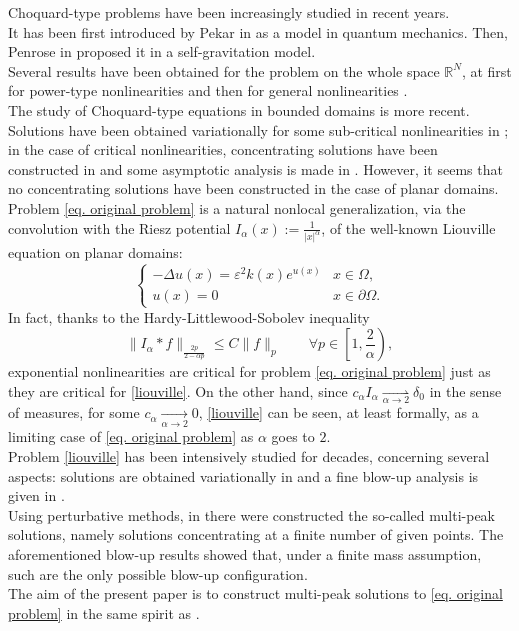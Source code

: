 \documentclass[11pt]{article}
\begin{document}
Choquard-type problems have been increasingly studied in recent years.\\
It has been first introduced by Pekar in \cite{pek} as a model in quantum mechanics. Then, Penrose in \cite{pen} proposed it in a self-gravitation model.\\
Several results have been obtained for the problem on the whole space $\mathbb R^N$, at first for power-type nonlinearities \cite{lieb,lio} and then for general nonlinearities \cite{mvs,bvs}.\\
The study of Choquard-type equations in bounded domains is more recent. Solutions have been obtained variationally for some sub-critical nonlinearities in \cite{gp,bc}; in the case of critical nonlinearities, concentrating solutions have been constructed in \cite{ghp} and some asymptotic analysis is made in \cite{ccyz}. However, it seems that no concentrating solutions have been constructed in the case of planar domains.\\

Problem \eqref{eq. original problem} is a natural nonlocal generalization, via the convolution with the Riesz potential $I_\alpha(x):=\frac1{|x|^\alpha}$, of the well-known Liouville equation on planar domains:
\begin{equation}\label{liouville}
\left\{\begin{array}{ll}-\Delta u(x)=\varepsilon^2k(x)e^{u(x)}&x\in\Omega,\\u(x)=0&x\in\partial\Omega.\end{array}\right.
\end{equation}
In fact, thanks to the Hardy-Littlewood-Sobolev inequality
$$\|I_\alpha\ast f\|_{\frac{2p}{2-\alpha p}}\le C\|f\|_p\qquad\forall p\in\left[1,\frac2\alpha\right),$$
exponential nonlinearities are critical for problem \eqref{eq. original problem} just as they are critical for \eqref{liouville}. On the other hand, since $c_\alpha I_\alpha\underset{\alpha\to2}\rightharpoonup\delta_0$ in the sense of measures, for some $c_\alpha\underset{\alpha\to2}\to0$, \eqref{liouville} can be seen, at least formally, as a limiting case of \eqref{eq. original problem} as $\alpha$ goes to $2$.\\

Problem \eqref{liouville} has been intensively studied for decades, concerning several aspects: solutions are obtained variationally in \cite{dja} and a fine blow-up analysis is given in \cite{bm,ls,mw}.\\
Using perturbative methods, in \cite{dkm,esp} there were constructed the so-called multi-peak solutions, namely solutions concentrating at a finite number of given points. The aforementioned blow-up results showed that, under a finite mass assumption, such are the only possible blow-up configuration.\\
The aim of the present paper is to construct multi-peak solutions to \eqref{eq. original problem} in the same spirit as \cite{dkm,esp}.\\
\end{document}

